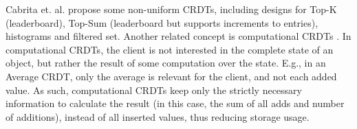 Cabrita et. al. \cite{nonUniform, nonUniformThesis} propose some non-uniform CRDTs, including designs for Top-K (leaderboard), Top-Sum (leaderboard but supports increments to entries), histograms and filtered set.
Another related concept is computational CRDTs \cite{computationalCrdt}.
In computational CRDTs, the client is not interested in the complete state of an object, but rather the result of some computation over the state.
E.g., in an Average CRDT, only the average is relevant for the client, and not each added value.
As such, computational CRDTs keep only the strictly necessary information to calculate the result (in this case, the sum of all adds and number of additions), instead of all inserted values, thus reducing storage usage.



